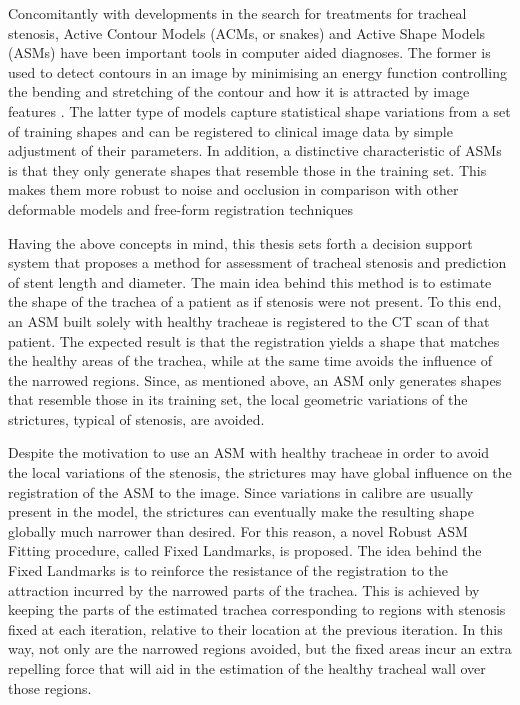 \documentclass[a4paper]{article}
\begin{document}
Concomitantly with developments in the search for treatments for tracheal stenosis, Active Contour Models (ACMs, or snakes) and Active Shape Models (ASMs) have been important tools in computer aided diagnoses. The former is used to detect contours in an image by minimising an energy function controlling the bending and stretching of the contour and how it is attracted by image features \citep{Kass}. The latter type of models capture statistical shape variations from a set of training shapes and can be registered to clinical image data by simple adjustment of their parameters.
In addition, a distinctive characteristic of ASMs is that they only generate shapes that resemble those in the training set. This makes them more robust to noise and occlusion in comparison with other deformable models and free-form registration techniques \citep{Cootes}

Having the above concepts in mind, this thesis sets forth a decision support
system that proposes a method for assessment of tracheal stenosis and
prediction of stent length and diameter. The main idea behind this method
is to estimate the shape of the trachea of a patient as if stenosis were not
present. To this end, an ASM built solely with healthy tracheae is registered
to the CT scan of that patient. The expected result is that the registration
yields a shape that matches the healthy areas of the trachea, while at the
same time avoids the influence of the narrowed regions. Since, as mentioned
above, an ASM only generates shapes that resemble those in its training
set, the local geometric variations of the strictures, typical of stenosis, are
avoided.

Despite the motivation to use an ASM with healthy tracheae in order
to avoid the local variations of the stenosis, the strictures may have global
influence on the registration of the ASM to the image. Since variations in
calibre are usually present in the model, the strictures can eventually make
the resulting shape globally much narrower than desired. For this reason, a
novel Robust ASM Fitting procedure, called Fixed Landmarks, is proposed.
The idea behind the Fixed Landmarks is to reinforce the resistance of the
registration to the attraction incurred by the narrowed parts of the trachea.
This is achieved by keeping the parts of the estimated trachea corresponding
to regions with stenosis fixed at each iteration, relative to their location
at the previous iteration. In this way, not only are the narrowed regions
avoided, but the fixed areas incur an extra repelling force that will aid in
the estimation of the healthy tracheal wall over those regions.
\end{document}
